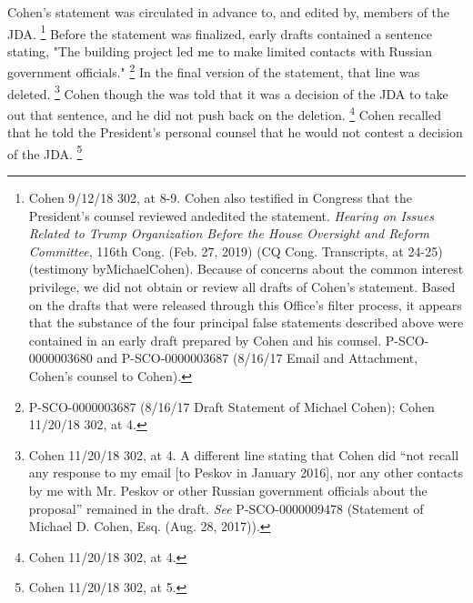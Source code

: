Cohen's statement was circulated in advance to, and edited by, members of the JDA.%
\footnote{Cohen 9/12/18 302, at 8-9.
Cohen also testified in Congress that the President’s counsel reviewed andedited the statement.
\textit{Hearing on Issues Related to Trump Organization Before the House Oversight and Reform Committee}, 116th Cong. (Feb. 27, 2019) (CQ Cong. Transcripts, at 24-25) (testimony byMichaelCohen).
Because of concerns about the common interest privilege, we did not obtain or review all drafts of Cohen’s statement.
Based on the drafts that were released through this Office’s filter process, it appears that the substance of the four principal false statements described above were contained in an early draft prepared by Cohen and his counsel.
P-SCO-0000003680 and P-SCO-0000003687 (8/16/17 Email and Attachment, Cohen’s counsel to Cohen).}
Before the statement was finalized, early drafts contained a sentence stating, "The building project led me to make limited contacts with Russian government officials."%
\footnote{P-SCO-0000003687 (8/16/17 Draft Statement of Michael Cohen);
Cohen 11/20/18 302, at 4.}
In the final version of the statement, that line was deleted.%
\footnote{Cohen 11/20/18 302, at 4.
A different line stating that Cohen did “not recall any response to my email [to Peskov in January 2016], nor any other contacts by me with Mr. Peskov or other Russian government officials about the proposal” remained in the draft.
\textit{See} P-SCO-0000009478 (Statement of Michael D. Cohen, Esq. (Aug. 28, 2017)).}
Cohen though the was told that it was a decision of the JDA to take out that sentence, and he did not push back on the deletion.%
\footnote{Cohen 11/20/18 302, at 4.}
Cohen recalled that he told the President's personal counsel that he would not contest a decision of the JDA.%
\footnote{Cohen 11/20/18 302, at 5.}

